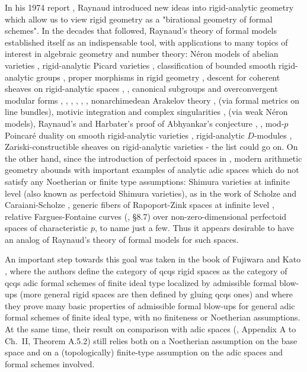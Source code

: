 \documentclass[12pt,twoside,a4paper]{article}
\theoremstyle{definition}
\theoremstyle{remark}
\begin{document}
In his 1974 report \cite{RaynaudReport}, Raynaud introduced new ideas into rigid-analytic geometry which allow us to view rigid geometry as a "birational geometry of formal schemes". In the decades that followed, Raynaud's theory of formal models established itself as an indispensable tool, with applications to many topics of interest in algebraic geometry and number theory: Néron models of abelian varieties \cite{Bosch-Xarles}, rigid-analytic Picard varieties \cite{HL00}, classification of bounded smooth rigid-analytic groups \cite{Luetkebohmert}, proper morphisms in rigid geometry \cite{L90}, descent for coherent sheaves on rigid-analytic spaces \cite{Bosch-Goertz}, \cite{ConradDescent}, canonical subgroups and overconvergent modular forms \cite{Andreatta-Gasbarri}, \cite{Conrad06-2}, \cite{Conrad06-3}, \cite{Kisin-Lai}, \cite{Bijakowski-Pilloni-Stroh}, \cite{Pilloni20}, nonarchimedean Arakelov theory \cite{Gubler98}, \cite{Gubler-Kuennemann17} (via formal metrics on line bundles), motivic integration and complex singularities \cite{Loeser-Sebag}, \cite{Nicaise-Sebag} (via weak Néron models), Raynaud's and Harbater's proof of Abhyankar's conjecture \cite{Raynaud94}, \cite{Harbater94}, mod-$p$ Poincaré duality on smooth rigid-analytic varieties \cite{Zavyalov24}, rigid-analytic $D$-modules \cite{Ardakov-Wadsley}, Zariski-constructible sheaves on rigid-analytic varieties \cite{Bhatt-Hansen} - the list could go on. On the other hand, since the introduction of perfectoid spaces in \cite{Scholze}, modern arithmetic geometry abounds with important examples of analytic adic spaces which do not satisfy any Noetherian or finite type assumptions: Shimura varieties at infinite level (also known as perfectoid Shimura varieties), as in the work of Scholze \cite{Scholze15} and Caraiani-Scholze \cite{CS17}, generic fibers of Rapoport-Zink spaces at infinite level \cite{SW13}, relative Fargues-Fontaine curves (\cite{Kedlaya-Liu}, \S8.7) over non-zero-dimensional perfectoid spaces of characteristic $p$, to name just a few. Thus it appears desirable to have an analog of Raynaud's theory of formal models for such spaces.

An important step towards this goal was taken in the book of Fujiwara and Kato \cite{FK}, where the authors define the category of qcqs rigid spaces as the category of qcqs adic formal schemes of finite ideal type localized by admissible formal blow-ups (more general rigid spaces are then defined by gluing qcqs ones) and where they prove many basic properties of admissible formal blow-ups for general adic formal schemes of finite ideal type, with no finiteness or Noetherian assumptions. At the same time, their result on comparison with adic spaces (\cite{FK}, Appendix A to Ch.~II, Theorem A.5.2) still relies both on a Noetherian assumption on the base space and on a (topologically) finite-type assumption on the adic spaces and formal schemes involved.
\end{document}
